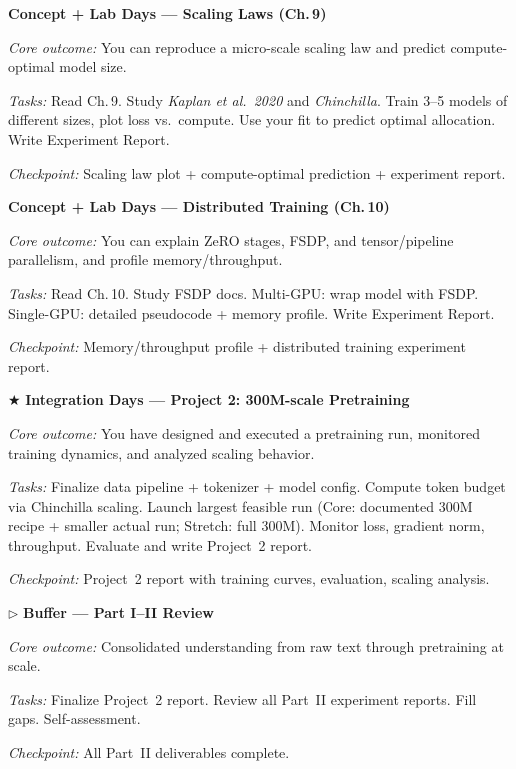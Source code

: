\begin{description}[style=nextline, leftmargin=1.8cm, labelwidth=1.5cm]
\item[Day 20--21] \textbf{Concept + Lab Days --- Scaling Laws (Ch.\,9)}

\textit{Core outcome:} You can reproduce a micro-scale scaling law and predict compute-optimal model size.

\textit{Tasks:} Read Ch.\,9. Study \emph{Kaplan et al.\ 2020} and \emph{Chinchilla}. Train 3--5 models of different sizes, plot loss vs.\ compute. Use your fit to predict optimal allocation. Write Experiment Report.

\textit{Checkpoint:} Scaling law plot + compute-optimal prediction + experiment report.

\item[Day 22--23] \textbf{Concept + Lab Days --- Distributed Training (Ch.\,10)}

\textit{Core outcome:} You can explain ZeRO stages, FSDP, and tensor/pipeline parallelism, and profile memory/throughput.

\textit{Tasks:} Read Ch.\,10. Study FSDP docs. Multi-GPU: wrap model with FSDP. Single-GPU: detailed pseudocode + memory profile. Write Experiment Report.

\textit{Checkpoint:} Memory/throughput profile + distributed training experiment report.

\item[Day 24--28] $\bigstar$ \textbf{Integration Days --- Project 2: 300M-scale Pretraining}

\textit{Core outcome:} You have designed and executed a pretraining run, monitored training dynamics, and analyzed scaling behavior.

\textit{Tasks:} Finalize data pipeline + tokenizer + model config. Compute token budget via Chinchilla scaling. Launch largest feasible run (Core: documented 300M recipe + smaller actual run; Stretch: full 300M). Monitor loss, gradient norm, throughput. Evaluate and write Project~2 report.

\textit{Checkpoint:} Project~2 report with training curves, evaluation, scaling analysis.

\item[Day 29--30] $\triangleright$ \textbf{Buffer --- Part I--II Review}

\textit{Core outcome:} Consolidated understanding from raw text through pretraining at scale.

\textit{Tasks:} Finalize Project~2 report. Review all Part~II experiment reports. Fill gaps. Self-assessment.

\textit{Checkpoint:} All Part~II deliverables complete.

\end{description}

